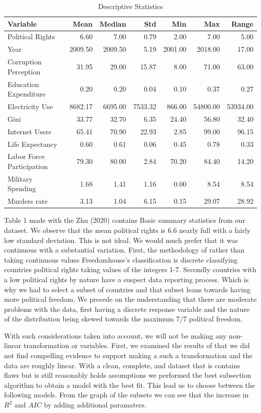 \documentclass[
  english,
  man,floatsintext]{apa6}
\begin{document}
\begin{longtable}[t]{lrrrrrr}
\caption{\label{tab:unnamed-chunk-1}Descriptive Statistics}\\
\toprule
Variable & Mean & Median & Std & Min & Max & Range\\
\midrule
Political Rights & 6.60 & 7.00 & 0.79 & 2.00 & 7.00 & 5.00\\
Year & 2009.50 & 2009.50 & 5.19 & 2001.00 & 2018.00 & 17.00\\
Corruption Perception & 31.95 & 29.00 & 15.87 & 8.00 & 71.00 & 63.00\\
Education Expenditure & 0.20 & 0.20 & 0.04 & 0.10 & 0.37 & 0.27\\
Electricity Use & 8682.17 & 6695.00 & 7533.32 & 866.00 & 54800.00 & 53934.00\\
\addlinespace
Gini & 33.77 & 32.70 & 6.35 & 24.40 & 56.80 & 32.40\\
Internet Users & 65.41 & 70.90 & 22.93 & 2.85 & 99.00 & 96.15\\
Life Expectancy & 0.60 & 0.61 & 0.06 & 0.45 & 0.78 & 0.33\\
Labor Force Participation & 79.30 & 80.00 & 2.84 & 70.20 & 84.40 & 14.20\\
Military Spending & 1.68 & 1.41 & 1.16 & 0.00 & 8.54 & 8.54\\
\addlinespace
Murders rate & 3.13 & 1.04 & 6.15 & 0.15 & 29.07 & 28.92\\
\bottomrule
\end{longtable}

Table 1 made with the Zhu (2020) contains Basic summary statistics from our dataset. We observe that the mean political rights is 6.6 nearly full with a fairly low standard deviation. This is not ideal. We would much prefer that it was continuous with a substantial variation. First, the methodology of rather than taking continuous values Freedomhouse's classification is discrete classifying countries political rights taking values of the integers 1-7. Secondly countries with a low political rights by nature have a suspect data reporting process. Which is why we had to select a subset of countries and that subset leans towards having more political freedom. We precede on the understanding that there are moderate problems with the data, first having a discrete response variable and the nature of the distribution being skewed towards the maximum 7/7 political freedom.

With such considerations taken into account, we will not be making any non-linear transformation or variables. First, we examined the results of that we did not find compelling evidence to support making a such a transformation and the data are roughly linear. With a clean, complete, and dataset that is contains flaws but is still reasonably holds assumptions we performed the best subsection algorithm to obtain a model with the best fit. This lead us to choose between the following models. From the graph of the subsets we can see that the increase in \(R^2\) and \(AIC\) by adding additional paramaters.
\end{document}
